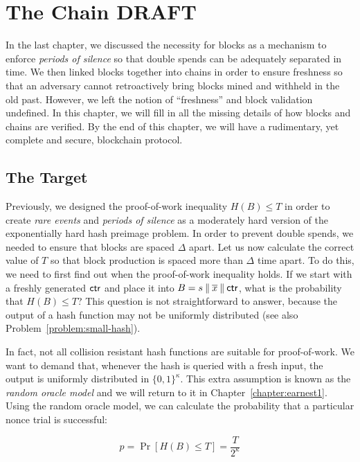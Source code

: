 \chapter{The Chain \small{\textsf{DRAFT}}}\label{chapter:chain}

In the last chapter, we discussed the necessity for blocks as a mechanism to enforce \emph{periods of silence} so that double spends
can be adequately separated in time.  We then linked blocks together into chains in order to ensure freshness so that an adversary cannot
retroactively bring blocks mined and withheld in the old past. However, we left the notion of ``freshness'' and block validation
undefined. In this chapter, we will fill in all the missing details of how blocks and chains are verified. By the end of this chapter,
we will have a rudimentary, yet complete and secure, blockchain protocol.

\section{The Target}

Previously, we designed the proof-of-work inequality $H(B) \leq T$ in order to create \emph{rare events} and \emph{periods of silence}
as a moderately hard version of the exponentially hard hash preimage problem. In order to prevent double spends, we needed to ensure
that blocks are spaced $\Delta$ apart. Let us now calculate the correct value of $T$ so that block production is spaced more than
$\Delta$ time apart. To do this, we need to first find out when the proof-of-work inequality holds. If we start
with a freshly generated $\mathsf{ctr}$ and place it into $B = s \mathbin{\|} \overline{x} \mathbin{\|} \mathsf{ctr}$, what is the probability that $H(B) \leq T$?
This question is not straightforward to answer, because the output of a hash function may not be uniformly distributed (see also
Problem~\ref{problem:small-hash}).

In fact, not all collision resistant hash functions are suitable for proof-of-work. We want to demand that, whenever the hash is queried with a fresh input, the output is uniformly distributed in $\{0,1\}^\kappa$. This extra assumption is known as the \emph{random oracle model} and we will return to it in Chapter~\ref{chapter:earnest1}. Using the random oracle model, we can calculate the probability that a particular nonce trial is successful:

\[
  p = \Pr[H(B) \leq T] = \frac{T}{2^\kappa}
\]

